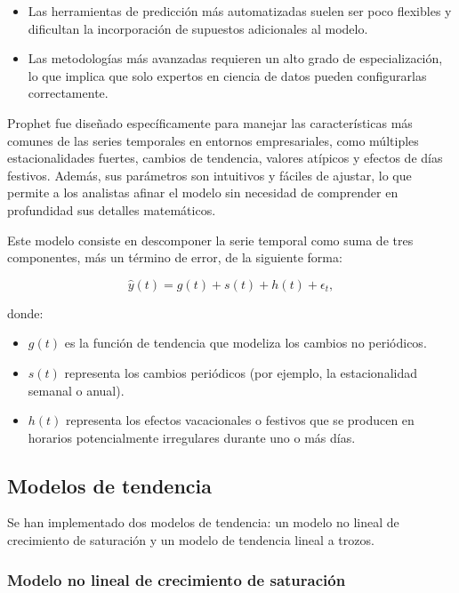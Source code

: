 \documentclass[12pt,twoside]{article}
\begin{document}
\begin{itemize}
    \item Las herramientas de predicción más automatizadas suelen ser poco flexibles y dificultan la incorporación de supuestos adicionales al modelo.
    \item Las metodologías más avanzadas requieren un alto grado de especialización, lo que implica que solo expertos en ciencia de datos pueden configurarlas correctamente.
\end{itemize}

Prophet fue diseñado específicamente para manejar las características más comunes de las series temporales en entornos empresariales, como múltiples estacionalidades fuertes, cambios de tendencia, valores atípicos y efectos de días festivos. Además, sus parámetros son intuitivos y fáciles de ajustar, lo que permite a los analistas afinar el modelo sin necesidad de comprender en profundidad sus detalles matemáticos.

Este modelo consiste en descomponer la serie temporal como suma de tres componentes, más un término de error, de la siguiente forma:

\begin{equation}
\hat{y}(t) = g(t) + s(t) + h(t) + \epsilon_t,
\end{equation}

donde:

\begin{itemize}
    \item $g(t)$ es la función de tendencia que modeliza los cambios no periódicos.
    \item $s(t)$ representa los cambios periódicos (por ejemplo, la estacionalidad semanal o anual).
    \item $h(t)$ representa los efectos vacacionales o festivos que se producen en horarios potencialmente irregulares durante uno o más días.
\end{itemize}

\subsection{Modelos de tendencia}\label{sec:2}

Se han implementado dos modelos de tendencia: un modelo no lineal de crecimiento de saturación y un modelo de tendencia lineal a trozos.

\subsubsection{Modelo no lineal de crecimiento de saturación}\label{sec:3}
\end{document}
